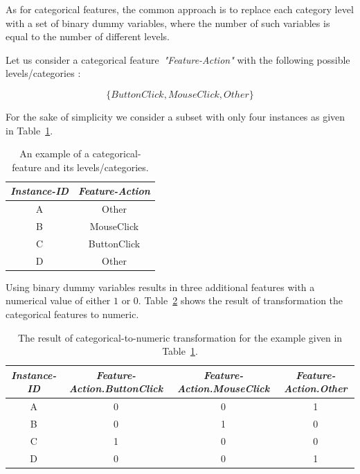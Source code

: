 As for categorical features, the common approach is to replace each category level with a set of binary dummy variables, where the number of such variables is equal to the number of different levels.

Let us consider a categorical feature~\textit{"Feature-Action"} with the following possible levels/categories : 

\[ \{ButtonClick, MouseClick, Other\} \]

For the sake of simplicity we consider a subset with only four instances as given in Table~\ref{tab:feature-categorical-rep}. 
\begin{table}[h!]
  \begin{center}
    \caption{An example of a categorical-feature and its levels/categories.}
    \label{tab:feature-categorical-rep}
    \begin{tabular}{|c|c|}\hline
    \textit{Instance-ID} & \textit{Feature-Action} \\
      \hline
     A & Other \\ 
     \hline 
       B & MouseClick \\ 
     \hline
       C & ButtonClick \\ 
     \hline
       D & Other \\ 
     \hline
    \end{tabular}
  \end{center}
\end{table}

Using binary dummy variables results in three additional features with a numerical value of either \(1\) or \(0\). Table~\ref{tab:feature-binarization} shows the result of transformation the categorical features to numeric.

\clearpage


\begin{table}
  \begin{center}
    \caption{The result of categorical-to-numeric transformation for the example given in Table~\ref{tab:feature-categorical-rep}.}
    \label{tab:feature-binarization}
    \begin{tabular}{|c|c|c|c|}\hline
    \textit{Instance-ID} & \textit{Feature-Action.ButtonClick} & \textit{Feature-Action.MouseClick} & \textit{Feature-Action.Other} \\
      \hline
     A & 0 & 0 & 1 \\ 
     \hline 
       B & 0 & 1 & 0 \\ 
     \hline
       C & 1 & 0 & 0 \\ 
     \hline
       D & 0 & 0 & 1 \\ 
     \hline
    \end{tabular}
  \end{center}
\end{table}

